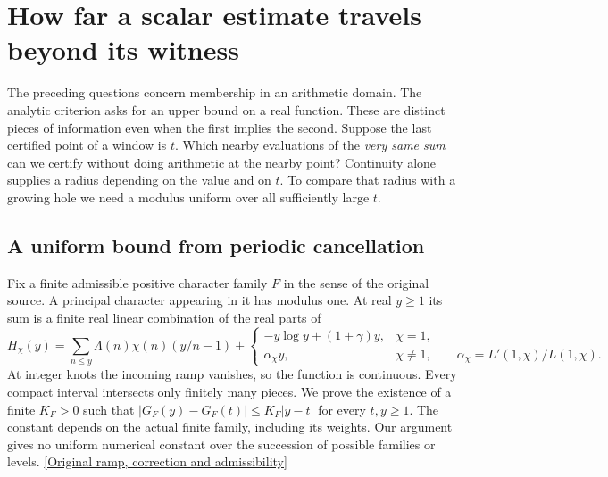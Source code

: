 \documentclass[12pt,letterpaper]{article}
\begin{document}
\section{How far a scalar estimate travels beyond its witness}
\label{sec:slope}
The preceding questions concern membership in an arithmetic domain. The analytic criterion asks for an upper bound on a real function. These are distinct pieces of information even when the first implies the second. Suppose the last certified point of a window is \(t\). Which nearby evaluations of the \emph{very same sum} can we certify without doing arithmetic at the nearby point? Continuity alone supplies a radius depending on the value and on \(t\). To compare that radius with a growing hole we need a modulus uniform over all sufficiently large \(t\).

\subsection{A uniform bound from periodic cancellation}
Fix a finite admissible positive character family \(F\) in the sense of the original source. A principal character appearing in it has modulus one. At real \(y\ge 1\) its sum is a finite real linear combination of the real parts of
\[
 H_\chi(y)=\sum_{n\le y}\Lambda(n)\chi(n)(y/n-1)+
 \begin{cases}
  -y\log y+(1+\gamma)y,&\chi=1,\\[2pt]
  \alpha_\chi y,&\chi\ne1,\qquad
   \alpha_\chi=L'(1,\chi)/L(1,\chi).
 \end{cases}
\]
At integer knots the incoming ramp vanishes, so the function is continuous. Every compact interval intersects only finitely many pieces. We prove the existence of a finite \(K_F>0\) such that \(|G_F(y)-G_F(t)|\le K_F|y-t|\) for every \(t,y\ge1\). The constant depends on the actual finite family, including its weights. Our argument gives no uniform numerical constant over the succession of possible families or levels. \href{https://github.com/nousentllc/riemann-hypothesis/blob/40e56bab026552e089d7afcfeff08d2defb9c005/src/Development/AutomorphicArithmetic/DedekindLFunctions/CharFamily.lean#L10-L36}{[Original ramp, correction and admissibility]}
\end{document}
